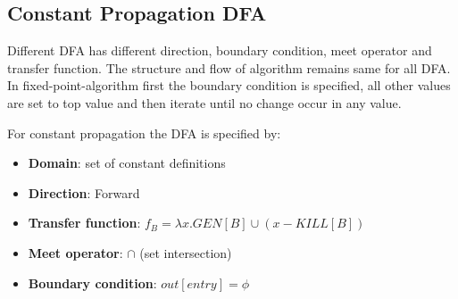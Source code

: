 \subsection{Constant Propagation DFA}
Different DFA has different direction, boundary condition, meet operator and transfer function. The structure and flow of algorithm remains same for all DFA. In fixed-point-algorithm first the boundary condition is specified, all other values are set to top value and then iterate until no change occur in any value.

For constant propagation the DFA is specified by:
\begin{itemize}
    \item \textbf{Domain}: set of constant definitions
    \item \textbf{Direction}: Forward
    \item \textbf{Transfer function}: $f_{B} = \lambda x. GEN[B] \cup (x-KILL[B]) $
    \item \textbf{Meet operator}: $\cap$ (set intersection)
    \item \textbf{Boundary condition}: $out[entry] = \phi$
\end{itemize}
